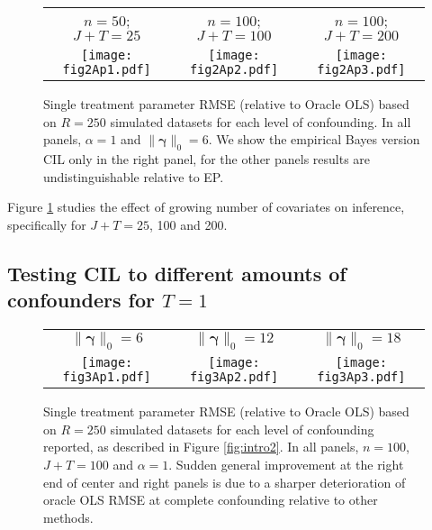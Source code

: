 \documentclass[12pt]{article}
\newcommand{\norm}[1]{\lVert#1\rVert}
\newcommand{\bgamma}{{\bm{\gamma}}}
\begin{document}
\begin{figure}[h]
\centering
\begin{tabular}{ccc}
$n = 50$; $J+T = 25$ & $n = 100$; $J+T = 100$ & $n = 100$; $J+T = 200$ \\
\texttt{[image: fig2Ap1.pdf]} &
\texttt{[image: fig2Ap2.pdf]} &
\texttt{[image: fig2Ap3.pdf]} 
\end{tabular}
\caption{Single treatment parameter RMSE (relative to Oracle OLS) based on $R=250$ simulated datasets for each level of confounding.
In all panels, $\alpha = 1$ and $\norm{\bgamma}_{0} = 6$. We show the empirical Bayes version CIL only in the right panel, for the other panels results are undistinguishable relative to EP.}
\label{fig:singletreat_growingdim}
\end{figure}


Figure \ref{fig:singletreat_growingdim} studies the effect of growing number of covariates on inference, specifically for $J+T=25$, 100 and 200.


\subsection{Testing CIL to different amounts of confounders for $T=1$}

\begin{figure}[h]
\centering
\begin{tabular}{ccc}
$\norm{\bgamma}_{0} = 6$ & $\norm{\bgamma}_{0} = 12$ & $\norm{\bgamma}_{0} = 18$ \\
\texttt{[image: fig3Ap1.pdf]} &
\texttt{[image: fig3Ap2.pdf]} &
\texttt{[image: fig3Ap3.pdf]}
\end{tabular}
\caption{Single treatment parameter RMSE (relative to Oracle OLS) based on $R=250$ simulated datasets for each level of confounding reported, as described in Figure \ref{fig:intro2}. In all panels, $n=100$, $J+T=100$ and $\alpha = 1$. Sudden general improvement at the right end of center and right panels is due to a sharper deterioration of oracle OLS RMSE at complete confounding relative to other methods.}
\label{fig:fig3}
\end{figure}
\end{document}
